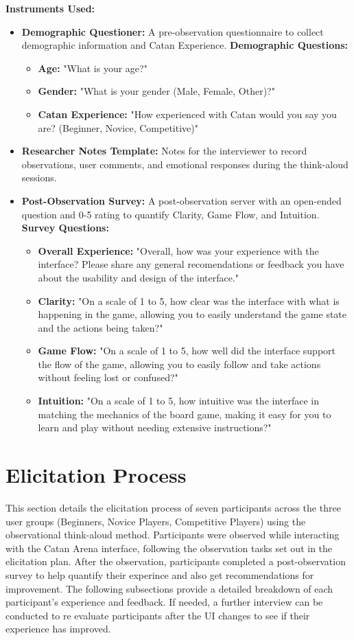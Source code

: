 \documentclass[12pt]{article}
\begin{document}
\textbf{Instruments Used:}
\begin{itemize}
    \item \textbf{Demographic Questioner:} A pre-observation questionnaire to collect demographic information and Catan Experience.
    \subitem \textbf{Demographic Questions:}
    \begin{itemize}
        \item \textbf{Age:} "What is your age?"
        \item \textbf{Gender:} "What is your gender (Male, Female, Other)?"
        \item \textbf{Catan Experience:} "How experienced with Catan would you say you are? (Beginner, Novice, Competitive)"
    \end{itemize}
    \item \textbf{Researcher Notes Template:} Notes for the interviewer to record observations, user comments, and emotional responses during the think-aloud sessions.
    \item \textbf{Post-Observation Survey:} A post-observation server with an open-ended question and 0-5 rating to quantify Clarity, Game Flow, and Intuition.
    \subitem \textbf{Survey Questions:}
    \begin{itemize}
        \item \textbf{Overall Experience:} "Overall, how was your experience with the interface? Please share any general recomendations or feedback you have about the usability and design of the interface."
        \item \textbf{Clarity:} "On a scale of 1 to 5, how clear was the interface with what is happening in the game, allowing you to easily understand the game state and the actions being taken?"
        \item \textbf{Game Flow:} "On a scale of 1 to 5, how well did the interface support the flow of the game, allowing you to easily follow and take actions without feeling lost or confused?"
        \item \textbf{Intuition:} "On a scale of 1 to 5, how intuitive was the interface in matching the mechanics of the board game, making it easy for you to learn and play without needing extensive instructions?"
    \end{itemize}
\end{itemize}

\section{Elicitation Process}
This section details the elicitation process of seven participants across the three user groups (Beginners, Novice Players, Competitive Players) using the observational think-aloud method. Participants were observed while interacting with the Catan Arena interface, following the observation tasks set out in the elicitation plan. After the observation, participants completed a post-observation survey to help quantify their experince and also get recommendations for improvement. The following subsections provide a detailed breakdown of each participant's experience and feedback. If needed, a further interview can be conducted to re evaluate participants after the UI changes to see if their experience has improved.
\end{document}
